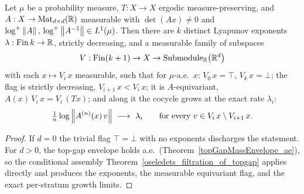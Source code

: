 \begin{theorem}\label{oseledets_filtration}
  \leanok
  Let \(\mu\) be a probability measure, \(T:X\to X\) ergodic measure-preserving, and
  \(A:X\to\mathrm{Mat}_{d\times d}(\mathbb{R})\) measurable with \(\det(A x)\neq 0\) and
  \(\log^{+}\left\lVert A \right\rVert,\,\log^{+}\left\lVert A^{-1} \right\rVert\in L^1(\mu)\). Then there are \(k\) distinct Lyapunov
  exponents \(\lambda:\mathrm{Fin}\,k\to\mathbb{R}\), strictly decreasing, and a measurable family of
  subspaces
  \[
    V : \mathrm{Fin}(k+1)\to X\to \mathrm{Submodule}_{\mathbb{R}}\bigl(\mathbb{R}^d\bigr)
  \]
  with each \(x\mapsto V_i\,x\) measurable, such that for \(\mu\)-a.e.\ \(x\):
  \(V_0\,x=\top\), \(V_k\,x=\bot\); the flag is strictly decreasing,
  \(V_{i+1}\,x < V_i\,x\); it is \(A\)-equivariant,
  \(A(x)\,V_i\,x = V_i\,(Tx)\); and along it the cocycle grows at the exact rate \(\lambda_i\):
  \[
    \tfrac1n\log\norm{A^{(n)}(x)\,v}\ \longrightarrow\ \lambda_i
    \qquad\text{for every } v\in V_i\,x\setminus V_{i+1}\,x .
  \]
\end{theorem}
\begin{proof}\leanok
  If \(d=0\) the trivial flag \(\top=\bot\) with no exponents discharges the statement. For
  \(d>0\), the top-gap envelope holds a.e.\ (Theorem~\ref{topGapMassEnvelope_ae}), so the
  conditional assembly Theorem~\ref{oseledets_filtration_of_topgap} applies directly and produces
  the exponents, the measurable equivariant flag, and the exact per-stratum growth limits.
\end{proof}
